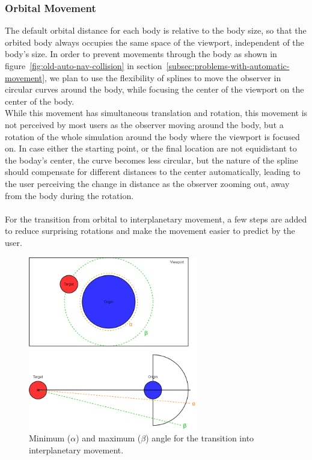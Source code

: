 \subsubsection{Orbital Movement}\label{subsubsec:orbital-movements}

The default orbital distance for each body is relative to the body size, so that the orbited body always occupies the
same space of the viewport, independent of the body's size.
In order to prevent movements through the body as shown in figure~\ref{fig:old-auto-nav-collision} in
section~\ref{subsec:problems-with-automatic-movement}, we plan to use the flexibility of splines to move the observer
in circular curves around the body, while focusing the center of the viewport on the center of the body.
\\
While this movement has simultaneous translation and rotation, this movement is not perceived by most users as the
observer moving around the body, but a rotation of the whole simulation around the body where the viewport is focused
on.
In case either the starting point, or the final location are not equidistant to the boday's center, the curve becomes
less circular, but the nature of the spline should compensate for different distances to the center automatically,
leading to the user perceiving the change in distance as the observer zooming out, away from the body during the
rotation.
\\
\\
For the transition from orbital to interplanetary movement, a few steps are added to reduce surprising rotations and
make the movement easier to predict by the user.

\begin{figure}[h]
    \centering
    \includegraphics[width=0.66\textwidth]{content/4_3_autoNavigation/img/OrbitTransitionAngles}
    \caption{Minimum ($\alpha$) and maximum ($\beta$) angle for the transition into interplanetary movement.}
    \label{fig:orbital-transition-angles}
\end{figure}

